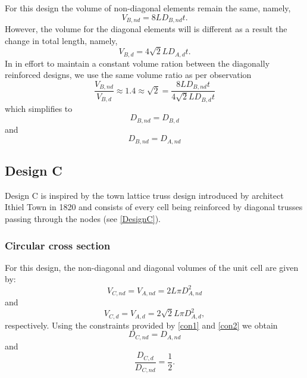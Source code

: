 \documentclass[10pt,twoside]{fernandes_supp}
\begin{document}
For this design the volume of non-diagonal elements remain the same, namely,
\begin{equation}
		V_{B,nd}=8LD_{B,nd}t.
\end{equation}
However, the volume for the diagonal elements will is different as a result the change in total length, namely,
\begin{equation}
		V_{B,d}=4\sqrt{2}LD_{A,d}t.
\end{equation}
In in effort to maintain a constant volume ration between the diagonally reinforced designs, we use the same volume ratio as per observation
\begin{equation}
		\frac{V_{B,nd}}{V_{B,d}}\approx 1.4\approx\sqrt{2}=\frac{8LD_{B,nd}t}{4\sqrt{2}LD_{B,d}t}
\end{equation}
which simplifies to
\begin{equation}
	D_{B,nd}=D_{B,d}
\end{equation}
and
\begin{equation}
	D_{B,nd}=D_{A,nd}
\end{equation}

\subsection{Design C}
Design C is inspired by the town lattice truss design introduced by architect Ithiel Town in 1820 \citep{waddell1916} and consists of every cell being reinforced by diagonal trusses passing through the nodes (see \cref{DesignC}).

\subsubsection{Circular cross section}
For this design, the non-diagonal and diagonal volumes of the unit cell are given by:
\begin{equation}
V_{C,nd}=V_{A,nd}=2 L \pi D^2_{A,nd}
\end{equation}
and
\begin{equation}
V_{C,d}=V_{A,d}=2\sqrt{2}L \pi D^2_{A,d},
\end{equation}
respectively.
Using the constraints provided by \cref{con1} and \cref{con2} we  obtain 
\begin{equation}
{{D}_{C,nd}}={{D}_{A,nd}}
\end{equation}
and
\begin{equation}
\frac{{D}_{C,d}}{{D}_{C,nd}}=\frac{1}{2}.
\end{equation}
\end{document}
